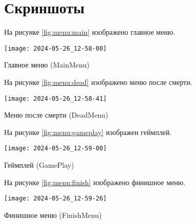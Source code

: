 \section{Скриншоты}

На рисунке \ref{fig:menu:main} изображено главное меню.                                                                            
\begin{image}
\texttt{[image: 2024-05-26\_12-58-00]}
\caption{Главное меню (MainMenu)}
\label{fig:menu:main}
\end{image}

На рисунке \ref{fig:menu:dead} изображено меню после смерти.                                                                            
\begin{image}
\texttt{[image: 2024-05-26\_12-58-41]}
\caption{Меню после смерти (DeadMenu)}
\label{fig:menu:dead}
\end{image}

На рисунке \ref{fig:menu:gameplay} изображен геймплей.                                                                            
\begin{image}
\texttt{[image: 2024-05-26\_12-59-00]}
\caption{Геймплей (GamePlay)}
\label{fig:menu:gameplay}
\end{image}

На рисунке \ref{fig:menu:finish} изображено финишное меню.                                                                            
\begin{image}
\texttt{[image: 2024-05-26\_12-59-26]}
\caption{Финишное меню (FinishMenu)}
\label{fig:menu:finish}
\end{image}


